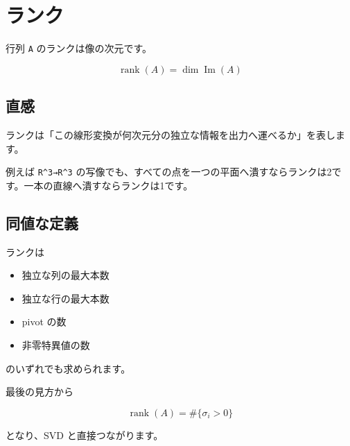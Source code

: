 \documentclass[
  11pt,
  a4paper,
]{ltjsarticle}
\author{}
\date{}
\providecommand{\tightlist}{%
  \setlength{\itemsep}{0pt}\setlength{\parskip}{0pt}}
\begin{document}
\hypertarget{ux30e9ux30f3ux30af}{%
\section{ランク}\label{ux30e9ux30f3ux30af}}

行列 \texttt{A} のランクは像の次元です。

\[
\operatorname{rank}(A)=\dim\operatorname{Im}(A)
\]

\hypertarget{ux76f4ux611f}{%
\subsection{直感}\label{ux76f4ux611f}}

ランクは「この線形変換が何次元分の独立な情報を出力へ運べるか」を表します。

例えば \texttt{R\^{}3→R\^{}3}
の写像でも、すべての点を一つの平面へ潰すならランクは2です。一本の直線へ潰すならランクは1です。

\hypertarget{ux540cux5024ux306aux5b9aux7fa9}{%
\subsection{同値な定義}\label{ux540cux5024ux306aux5b9aux7fa9}}

ランクは

\begin{itemize}
\tightlist
\item
  独立な列の最大本数
\item
  独立な行の最大本数
\item
  pivot の数
\item
  非零特異値の数
\end{itemize}

のいずれでも求められます。

最後の見方から

\[
\operatorname{rank}(A)=\#\{\sigma_i>0\}
\]

となり、SVD と直接つながります。
\end{document}
